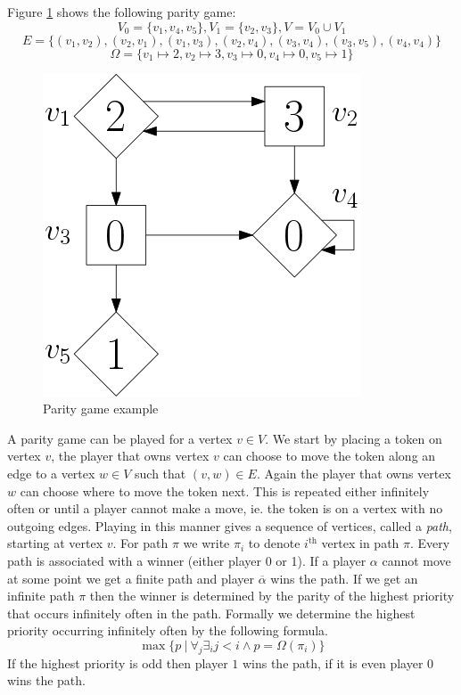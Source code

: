 \begin{example}
	Figure \ref{fig:simplepgpg} shows the following parity game:
	\[ V_0 = \{v_1,v_4,v_5\},V_1 = \{v_2,v_3\}, V = V_0 \cup V_1\]
	\[ E = \{(v_1,v_2),(v_2,v_1),(v_1,v_3),(v_2,v_4),(v_3,v_4),(v_3,v_5),(v_4,v_4)\}\] 
	\[ \Omega = \{v_1 \mapsto 2, v_2 \mapsto 3, v_3 \mapsto 0, v_4 \mapsto 0, v_5 \mapsto 1 \}\]
	\begin{figure}[h]
		\centering
		\includegraphics[scale=0.3]{Examples/SimplePG/PG}
		\caption[Parity game example]{Parity game example}
		\label{fig:simplepgpg}
	\end{figure}
\end{example}

A parity game can be played for a vertex $v \in V$. We start by placing a token on vertex $v$, the player that owns vertex $v$ can choose to move the token along an edge to a vertex $w \in V$ such that $(v,w) \in E$. Again the player that owns vertex $w$ can choose where to move the token next. This is repeated either infinitely often or until a player cannot make a move, ie. the token is on a vertex with no outgoing edges. Playing in this manner gives a sequence of vertices, called a \textit{path}, starting at vertex $v$. For path $\pi$ we write $\pi_i$ to denote $i^\text{th}$ vertex in path $\pi$. Every path is associated with a winner (either player 0 or 1). If a player $\alpha$ cannot move at some point we get a finite path and player $\overline{\alpha}$ wins the path. If we get an infinite path $\pi$ then the winner is determined by the parity of the highest priority that occurs infinitely often in the path. Formally we determine the highest priority occurring infinitely often by the following formula.
\[ \max\{ p \ |\ \forall_j \exists_i j < i \wedge p = \Omega(\pi_i) \}\] 
If the highest priority is odd then player $1$ wins the path, if it is even player $0$ wins the path.


